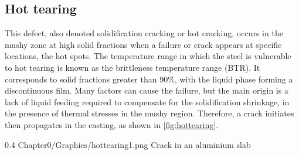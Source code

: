 \subsection*{Hot tearing} 
%
This defect, also denoted solidification cracking or hot cracking, occurs in the mushy zone 
at high solid fractions when a failure or crack appears at specific locations, the hot spots. 
The temperature range in which the steel is vulnerable to hot tearing is known as the brittleness 
temperature range (BTR). It corresponds to solid fractions greater than \num{90}\%, with the liquid 
phase forming a discontinuous film. Many factors can cause the failure, but the main origin is a 
lack of liquid feeding required to compensate for the solidification shrinkage, in the presence of 
thermal stresses in the mushy region. Therefore, a crack initiates then propagates in the casting, as shown in \cref{fig:hottearing}. 
\begin{figureth}
{0.4}
{Chapter0/Graphics/hottearing1.png}
{Crack in an aluminium slab}
\label{fig:hottearing}
\end{figureth}
